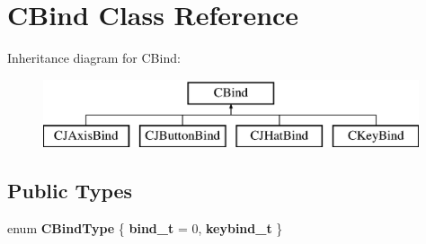 \hypertarget{classCBind}{\section{C\-Bind Class Reference}
\label{classCBind}
}
Inheritance diagram for C\-Bind\-:\begin{figure}[H]
\begin{center}
\leavevmode
\includegraphics[height=2.000000cm]{classCBind}
\end{center}
\end{figure}
\subsection*{Public Types}
\begin{DoxyCompactItemize}
\item 
enum {\bfseries C\-Bind\-Type} \{ {\bfseries bind\-\_\-t} = 0, 
{\bfseries keybind\-\_\-t}
 \}
\end{DoxyCompactItemize}
